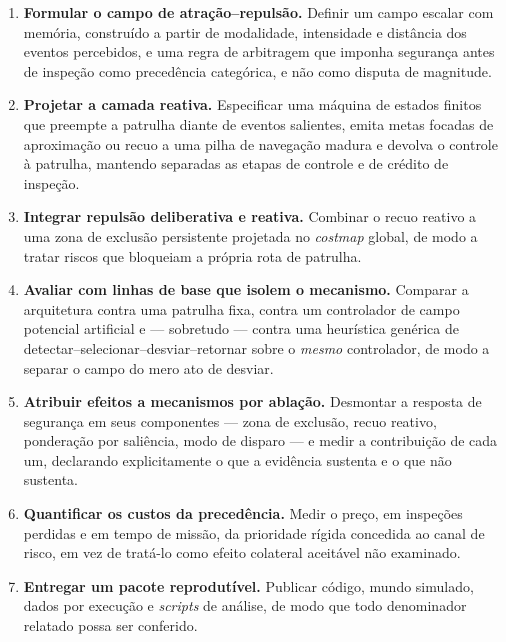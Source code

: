 \begin{enumerate}
    \item \textbf{Formular o campo de atração--repulsão.} Definir um campo escalar
    com memória, construído a partir de modalidade, intensidade e distância dos
    eventos percebidos, e uma regra de arbitragem que imponha segurança antes de
    inspeção como precedência categórica, e não como disputa de magnitude.

    \item \textbf{Projetar a camada reativa.} Especificar uma máquina de estados
    finitos que preempte a patrulha diante de eventos salientes, emita metas focadas
    de aproximação ou recuo a uma pilha de navegação madura e devolva o controle à
    patrulha, mantendo separadas as etapas de controle e de crédito de inspeção.

    \item \textbf{Integrar repulsão deliberativa e reativa.} Combinar o recuo
    reativo a uma zona de exclusão persistente projetada no \textit{costmap} global,
    de modo a tratar riscos que bloqueiam a própria rota de patrulha.

    \item \textbf{Avaliar com linhas de base que isolem o mecanismo.} Comparar a
    arquitetura contra uma patrulha fixa, contra um controlador de campo potencial
    artificial e --- sobretudo --- contra uma heurística genérica de
    detectar--selecionar--desviar--retornar sobre o \emph{mesmo} controlador, de
    modo a separar o campo do mero ato de desviar.

    \item \textbf{Atribuir efeitos a mecanismos por ablação.} Desmontar a resposta
    de segurança em seus componentes --- zona de exclusão, recuo reativo, ponderação
    por saliência, modo de disparo --- e medir a contribuição de cada um, declarando
    explicitamente o que a evidência sustenta e o que não sustenta.

    \item \textbf{Quantificar os custos da precedência.} Medir o preço, em inspeções
    perdidas e em tempo de missão, da prioridade rígida concedida ao canal de risco,
    em vez de tratá-lo como efeito colateral aceitável não examinado.

    \item \textbf{Entregar um pacote reprodutível.} Publicar código, mundo simulado,
    dados por execução e \textit{scripts} de análise, de modo que todo denominador
    relatado possa ser conferido.
\end{enumerate}

